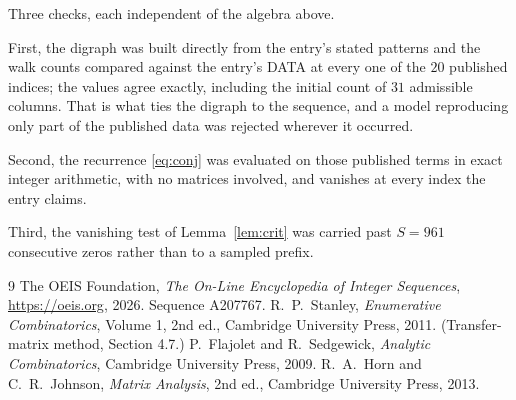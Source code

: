 \documentclass[11pt,a4paper]{article}
\theoremstyle{plain}
\theoremstyle{definition}
\begin{document}
Three checks, each independent of the algebra above.

First, the digraph was built directly from the entry's stated patterns and the walk counts
compared against the entry's DATA at every one of the $20$ published indices; the
values agree exactly, including the initial count of $31$ admissible columns. That is
what ties the digraph to the sequence, and a model reproducing only part of the published
data was rejected wherever it occurred.

Second, the recurrence \eqref{eq:conj} was evaluated on those published terms in exact
integer arithmetic, with no matrices involved, and vanishes at every index the entry claims.

Third, the vanishing test of Lemma~\ref{lem:crit} was carried past $S=961$ consecutive
zeros rather than to a sampled prefix.

\begin{thebibliography}{9}
 The OEIS Foundation, \emph{The On-Line Encyclopedia of Integer
Sequences}, \url{https://oeis.org}, 2026. Sequence A207767.
 R.~P.~Stanley, \emph{Enumerative Combinatorics}, Volume 1, 2nd ed.,
Cambridge University Press, 2011. (Transfer-matrix method, Section 4.7.)
 P.~Flajolet and R.~Sedgewick, \emph{Analytic Combinatorics}, Cambridge
University Press, 2009.
 R.~A.~Horn and C.~R.~Johnson, \emph{Matrix Analysis}, 2nd ed., Cambridge
University Press, 2013.
\end{thebibliography}
\end{document}
